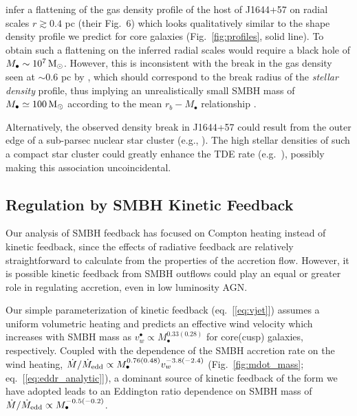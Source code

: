 \documentclass[usenatbib,fleqn]{mn2e}
\newcommand{\Mbh}[1][]{M_{\bullet#1}}
\begin{document}
\citet{BergerZauderer+:2012a} infer a flattening of the gas density
profile of the host of J1644+57 on radial scales $r \gtrsim 0.4$ pc
(their Fig.~6) which looks qualitatively similar to the shape density
profile we predict for core galaxies (Fig.~\ref{fig:profiles}, solid
line).  To obtain such a flattening on the inferred radial scales
would require a black hole of $\Mbh\sim 10^7 \Msun$.  However, this is
inconsistent with the break in the gas density seen at $\sim 0.6$ pc
by \citet{BergerZauderer+:2012a}, which should correspond to the break
radius of the {\it stellar density} profile, thus implying an
unrealistically small SMBH mass of $\Mbh\simeq 100\Msun$ according to
the mean $r_b-M_{\bullet}$ relationship \citep{LauerFaber+:2007a}.

Alternatively, the observed density break in J1644+57 could result from the outer edge of a sub-parsec nuclear star cluster (e.g., \citealt{Carson+15}).  The high stellar densities of such a compact star cluster could greatly enhance the TDE rate (e.g.~\citealt{Stone&Metzger15}), possibly making this association uncoincidental.


\subsection{Regulation by SMBH Kinetic Feedback}
\label{sec:kinetic}

Our analysis of SMBH feedback has focused on Compton heating
instead of kinetic feedback, since the effects of radiative feedback
are relatively straightforward to calculate from the properties of the
accretion flow.  However, it is possible kinetic feedback from SMBH outflows could play an equal or greater role in regulating accretion, even in low luminosity AGN.

Our simple parameterization of kinetic feedback (eq.~[\ref{eq:vjet}]) assumes a uniform volumetric heating and predicts an
effective wind velocity which increases with SMBH mass as
$v_{w}^{\bullet} \propto M_{\bullet}^{0.33(0.28)}$ for core(cusp)
galaxies, respectively.  Coupled with the dependence of the SMBH
accretion rate on the wind heating, $\dot{M}/\dot{M}_{\rm edd} \propto
M_{\bullet}^{0.76(0.48)}v_{w}^{-3.8(-2.4)}$ (Fig.~\ref{fig:mdot_mass};
eq.~[\ref{eq:eddr_analytic}]), a dominant source of kinetic feedback of the form we have
adopted leads to an Eddington ratio dependence on SMBH mass of
$\dot{M}/\dot{M}_{\rm edd} \propto M_{\bullet}^{-0.5(-0.2)}$.
\end{document}
